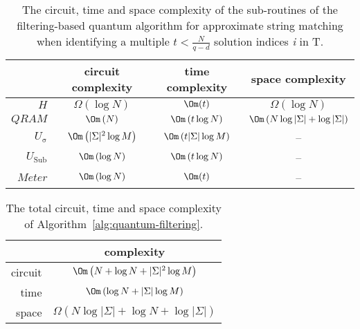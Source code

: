 \begin{table}[h!]
	\centering
	\begin{tabular}{ | r || c | c | c |}
		\hline
		\quad                              & circuit complexity                                                  & time complexity                                                 & space complexity\\
		\hline\hline
		$H$                                & $\Omega\left(\log N\right)$                              & $\Om(t)$                                                         & $\Omega\left(\log N\right)$\\
		\hline
		$QRAM$                          & $\Om\left( N \right)$                                            & $\Om\left( t\log N \right)$                             & $\Om\left( N\log \vert \Sigma \vert + \log\vert \Sigma \vert \right)$\\
		\hline
		$U_{\mathrm{\sigma}}$  & $\Om\left(\vert \Sigma \vert^2\log M \right)$  & $\Om\left( t\vert \Sigma \vert\log M \right)$  & --\\
		\hline
		$U_{\mathrm{Sub}}$      & $\Om\left( \log N \right)$                                 & $\Om\left( t\log N \right)$                              & --\\
		\hline
		$Meter$                         & $\Om\left(\log N\right)$                                   & $\Om(t)$                                                          & --\\
		\hline
	\end{tabular}
	\caption{The circuit, time and space complexity of the sub-routines of the filtering-based quantum algorithm for approximate string matching when identifying a multiple $t < \frac{N}{q-d}$ solution indices \textit{i} in T.}
	\label{tab:quantum-filtering-verification-complexity}
\end{table}

\begin{table}[h!]
	\centering
	\begin{tabular}{| r || c |}
		\hline
		\quad            & complexity \\
		\hline\hline
		circuit           & $\Om\left(N + \log N + \vert \Sigma \vert^2\log M \right)$\\
		\hline
		time             & $\Om\left( \log N + \vert \Sigma \vert\log M \right)$\\
		\hline
		space           & $\Omega\left( N\log\vert \Sigma \vert + \log N + \log \vert \Sigma \vert \right)$\\
		\hline
	\end{tabular}
	\caption{The total circuit, time and space complexity of Algorithm~\ref{alg:quantum-filtering}.}
	\label{tab:quantum-filtering-verification-complexity-multiple-solutions}
\end{table}


